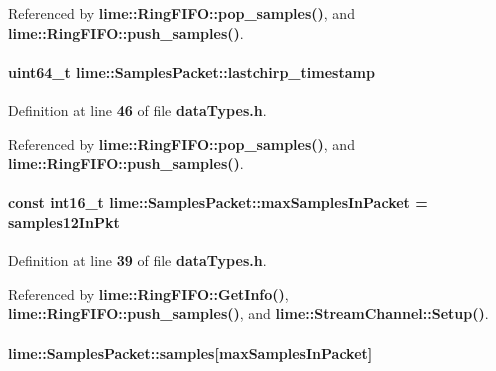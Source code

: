 Referenced by {\bf lime\+::\+Ring\+F\+I\+F\+O\+::pop\+\_\+samples()}, and {\bf lime\+::\+Ring\+F\+I\+F\+O\+::push\+\_\+samples()}.

\paragraph[{lastchirp\+\_\+timestamp}]{\setlength{\rightskip}{0pt plus 5cm}uint64\+\_\+t lime\+::\+Samples\+Packet\+::lastchirp\+\_\+timestamp}\label{classlime_1_1SamplesPacket_a011c16bc419b541b2666d16584efb66a}


Definition at line {\bf 46} of file {\bf data\+Types.\+h}.



Referenced by {\bf lime\+::\+Ring\+F\+I\+F\+O\+::pop\+\_\+samples()}, and {\bf lime\+::\+Ring\+F\+I\+F\+O\+::push\+\_\+samples()}.

\paragraph[{max\+Samples\+In\+Packet}]{\setlength{\rightskip}{0pt plus 5cm}const int16\+\_\+t lime\+::\+Samples\+Packet\+::max\+Samples\+In\+Packet = {\bf samples12\+In\+Pkt}\hspace{0.3cm}{\ttfamily [static]}}\label{classlime_1_1SamplesPacket_adfe50bd26d1dd08f9ef90f666fd99ff0}


Definition at line {\bf 39} of file {\bf data\+Types.\+h}.



Referenced by {\bf lime\+::\+Ring\+F\+I\+F\+O\+::\+Get\+Info()}, {\bf lime\+::\+Ring\+F\+I\+F\+O\+::push\+\_\+samples()}, and {\bf lime\+::\+Stream\+Channel\+::\+Setup()}.

\paragraph[{samples}]{ lime\+::\+Samples\+Packet\+::samples[{\bf max\+Samples\+In\+Packet}]}\label{classlime_1_1SamplesPacket_a0480a3a91b726a45099ef587e45efc0f}


